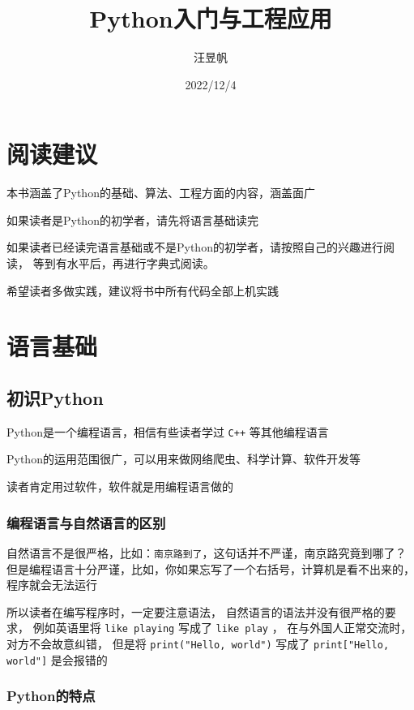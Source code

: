 \documentclass{book}
\title{Python入门与工程应用}
\author{汪昱帆}
\date{2022/12/4}
\begin{document}
\maketitle
\tableofcontents
\setcounter{part}{-1}
\setcounter{chapter}{0}
\part{阅读建议}
本书涵盖了Python的基础、算法、工程方面的内容，涵盖面广


如果读者是Python的初学者，请先将语言基础读完


如果读者已经读完语言基础或不是Python的初学者，请按照自己的兴趣进行阅读，
等到有水平后，再进行字典式阅读。


希望读者多做实践，建议将书中所有代码全部上机实践


\part{语言基础}
\chapter{初识Python}
\indent Python是一个编程语言，相信有些读者学过 \verb|C++| 等其他编程语言


Python的运用范围很广，可以用来做网络爬虫、科学计算、软件开发等


读者肯定用过软件，软件就是用编程语言做的

\section{编程语言与自然语言的区别}

\indent 自然语言不是很严格，比如：\verb|南京路到了|，这句话并不严谨，南京路究竟到哪了？但是编程语言十分严谨，比如，你如果忘写了一个右括号，计算机是看不出来的，程序就会无法运行


所以读者在编写程序时，一定要注意语法，
自然语言的语法并没有很严格的要求，
例如英语里将 \verb|like playing| 
写成了 \verb|like play| ，
在与外国人正常交流时，对方不会故意纠错，
但是将 \verb|print("Hello, world")| 
写成了 \verb|print["Hello, world"]| 
是会报错的

\section{Python的特点}
\end{document}
